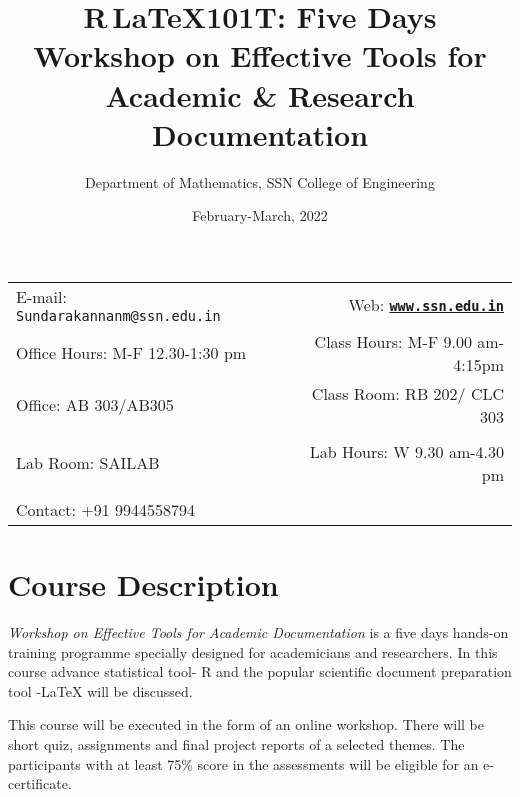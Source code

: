 \documentclass[11pt]{article}
\title{R\,\LaTeX{}101T: Five Days Workshop on Effective Tools for Academic \& Research Documentation}
\author{Department of Mathematics, SSN College of Engineering}
\date{February-March, 2022}
\newcommand{\blankline}{\quad\pagebreak[2]}
\begin{document}
\maketitle

\blankline

\begin{tabular*}{.93\textwidth}{@{\extracolsep{\fill}}lr}


E-mail: \texttt{Sundarakannanm@ssn.edu.in} & Web: \href{https://www.ssn.edu.in/college-of-engineering/mathematics-department-ssn-institutions/}{\tt\bf www.ssn.edu.in}  \\

 Office Hours: M-F 12.30-1:30 pm  &  Class Hours: M-F 9.00 am-4:15pm \\

 Office: AB 303/AB305 & Class Room: RB 202/ CLC 303 \\
 & \\
Lab Room: SAILAB & Lab Hours: W 9.30 am-4.30 pm \\
&\\
Contact: +91 9944558794 &  \\
\hline
\end{tabular*}

\vspace{5 mm}


\section*{Course Description}

{\em Workshop on Effective Tools for Academic Documentation} is a five days hands-on training programme specially designed for academicians and researchers. In this course advance statistical tool- R and the popular scientific document preparation tool -\LaTeX{} will be discussed. 

\bigskip

\noindent This course will be executed in the form of an online workshop. There will be short quiz, assignments and final project reports of a selected themes. The participants with at least 75\% score in the assessments will be eligible for an e-certificate.

\end{document}
